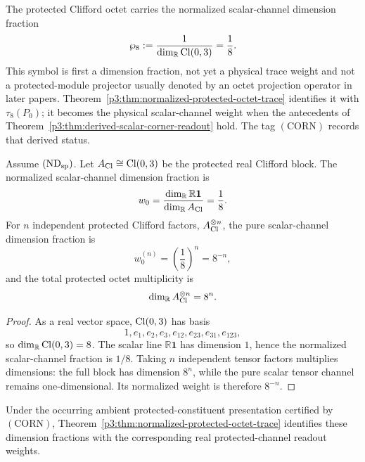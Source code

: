 \documentclass[12pt,a4paper]{article}
\begin{document}
\begin{definition}
\label{p3:def:octet-scalar-projection-weight}
The protected Clifford octet carries the normalized scalar-channel dimension
fraction
\begin{equation}
\label{p3:eq:octet-scalar-projection-weight}
\wp_8:=\frac{1}{\dim_{\mathbb{R}}\operatorname{Cl}(0,3)}=\frac18.
\end{equation}
This symbol is first a dimension fraction, not yet a physical trace weight and
not a protected-module projector usually denoted by an octet projection
operator in later papers.  Theorem~\ref{p3:thm:normalized-protected-octet-trace}
identifies it with \(\tau_8(P_0)\); it becomes the physical scalar-channel
weight when the antecedents of
Theorem~\ref{p3:thm:derived-scalar-corner-readout} hold.  The tag
\((\mathrm{CORN})\) records that derived status.
\end{definition}

\begin{theorem}
\label{p3:thm:octet-scalar-projection-rule}
Assume \((\mathrm{ND}_{\rm sp})\).  Let $A_{\rm Cl}\cong\operatorname{Cl}(0,3)$ be the protected real Clifford block.  The
normalized scalar-channel dimension fraction is
\[
w_0=\frac{\dim_{\mathbb R}\mathbb R\mathbf 1}{\dim_{\mathbb R}A_{\rm Cl}}=\frac18.
\]
For $n$ independent protected Clifford factors,
$A_{\rm Cl}^{\otimes n}$, the pure scalar-channel dimension fraction is
\[
w_0^{(n)}=\left(\frac18\right)^n=8^{-n},
\]
and the total protected octet multiplicity is
\[
\dim_{\mathbb R}A_{\rm Cl}^{\otimes n}=8^n.
\]
\end{theorem}

\begin{proof}
As a real vector space, $\operatorname{Cl}(0,3)$ has basis
\[
1,e_1,e_2,e_3,e_{12},e_{23},e_{31},e_{123},
\]
so $\dim_{\mathbb R}\operatorname{Cl}(0,3)=8$.  The scalar line $\mathbb R\mathbf 1$ has dimension $1$, hence the normalized scalar-channel fraction is $1/8$.  Taking $n$ independent tensor factors multiplies dimensions: the full block has dimension $8^n$, while the pure scalar tensor channel remains one-dimensional.  Its normalized weight is therefore $8^{-n}$.
\end{proof}

Under the occurring ambient protected-constituent presentation certified by
\((\mathrm{CORN})\),
Theorem~\ref{p3:thm:normalized-protected-octet-trace} identifies these
dimension fractions with the corresponding real protected-channel readout
weights.
\end{document}
